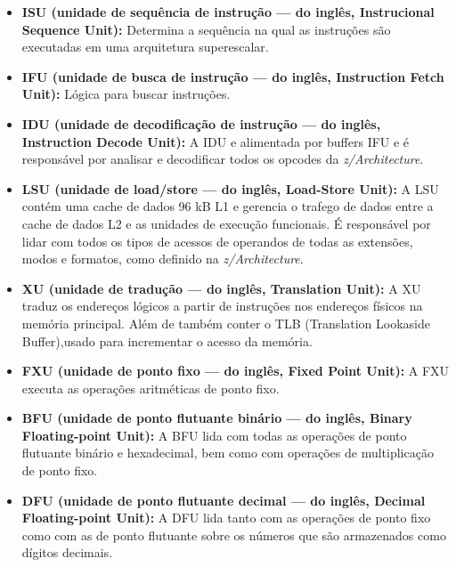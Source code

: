 \documentclass{article}
\begin{document}
\begin{itemize}
    \item \textbf{ISU (unidade de sequência de instrução — do inglês,
        Instrucional Sequence Unit):} Determina a sequência na qual as
        instruções são executadas em uma arquitetura superescalar.

    \item \textbf{IFU (unidade de busca de instrução — do inglês, Instruction
        Fetch Unit):} Lógica para buscar instruções.

    \item \textbf{IDU (unidade de decodificação de instrução — do inglês,
        Instruction Decode Unit):} A IDU e alimentada por buffers IFU e é
        responsável por analisar e decodificar todos os opcodes da
        \textit{z/Architecture}.

    \item  \textbf{LSU (unidade de load/store — do inglês, Load-Store Unit):} A
        LSU contém uma cache de dados 96 kB L1 e gerencia o trafego de dados
        entre a cache de dados L2 e as unidades de execução funcionais. É
        responsável por lidar com todos os tipos de acessos de operandos de
        todas as extensões, modos e formatos, como definido na
        \textit{z/Architecture}.

    \item \textbf{XU (unidade de tradução — do inglês, Translation Unit):} A XU
        traduz os endereços lógicos a partir de instruções nos endereços físicos
        na memória principal. Além de também conter o TLB (Translation Lookaside
        Buffer),usado para incrementar o acesso da memória.

    \item \textbf{FXU (unidade de ponto fixo — do inglês, Fixed Point Unit):} A
        FXU executa as operações aritméticas de ponto fixo.

    \item \textbf{BFU (unidade de ponto flutuante binário — do inglês, Binary
        Floating-point Unit):} A BFU lida com todas as operações de ponto
        flutuante binário e hexadecimal, bem como com operações de multiplicação
        de ponto fixo.

    \item \textbf{DFU (unidade de ponto flutuante decimal — do inglês, Decimal
        Floating-point Unit):} A DFU lida tanto com as operações de ponto fixo
        como com as de ponto flutuante sobre os números que são armazenados como
        dígitos decimais.


\end{itemize}
\end{document}
